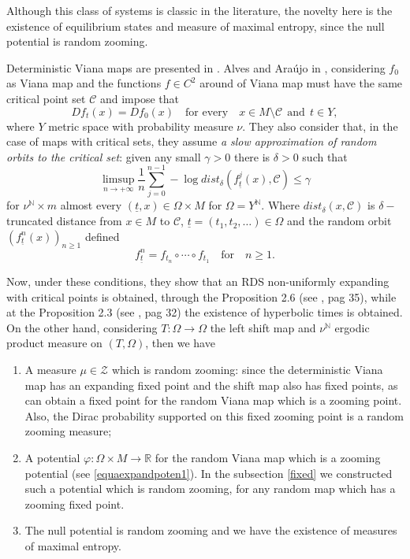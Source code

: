 \documentclass[12pt,a4paper]{amsart}
\theoremstyle{plain}
\begin{document}
	
	Although this class of systems is classic in the literature, the novelty here is the existence of equilibrium states and measure of maximal entropy, since the null potential is random zooming. 
	
	Deterministic Viana maps are presented in \cite{A,V}. Alves and Ara\'ujo in \cite{AlvesAraujo}, considering $f_0$ as Viana map and the functions $f\in C^2$ around of Viana map must have the same critical point set $\mathcal{C}$ and impose that
	\[
	Df_{t}(x)=Df_0(x) \quad \text{for every} \quad x\in M\setminus \mathcal{C} \ \ \text{and} \ \ t\in Y,
	\]
	where $Y$ metric space with probability measure $\nu$. They also consider that, in the case of maps with critical sets, they assume {\it a slow approximation of random orbits to the critical set}: given any small $\gamma > 0$ there is $\delta >0$ such that
	$$
	\limsup_{n\to +\infty}\dfrac{1}{n}\sum_{j=0}^{n-1}-\log dist_{\delta} (f_{\underline{t}}^{j}(x), \mathcal{C}) \le \gamma
	$$
	for  $ \nu^{\mathbb{N}}\times m$ almost every $(\underline{t},x) \in \Omega\times M$ for $\Omega = Y^{\mathbb{N}}$. Where $dist_{\delta}(x,\mathcal{C})$  is $\delta-$truncated distance from $x\in M$ to $\mathcal{C}$, $\underline{t}=(t_1,t_2,\dots)\in \Omega$ and the random orbit $(f_{\underline{t}}^{n}(x))_{n\geq 1}$ defined
	$$
	f_{\underline{t}}^{n}= f_{t_n}\circ \cdots \circ f_{t_1} \quad \text{for} \quad n\ge 1
	. $$
	
	Now, under these conditions, they show that an RDS non-uniformly expanding with critical points is obtained, through the Proposition 2.6 (see \cite{AlvesAraujo}, pag 35), while at the Proposition 2.3 (see \cite{AlvesAraujo}, pag 32) the existence of hyperbolic times is obtained. \\
	On the other hand, considering $T:\Omega \rightarrow \Omega$  the left shift  map and $\nu^{\mathbb{N}}$ ergodic product measure on $(T, \Omega)$, then we have 
	
	\begin{enumerate}
		\item  [i)] A measure $\mu \in \mathcal{Z}$ which is random zooming: since the deterministic Viana map has an expanding fixed point and the shift map also has fixed points, as can obtain a fixed point for the random Viana map which is a zooming point. Also, the Dirac probability supported on this fixed zooming point is a random zooming measure; 
		
		\item [ii)] A potential $\varphi: \Omega\times M \rightarrow \mathbb{R}$  for the random Viana map which is a zooming potential (see \ref{equaexpandpoten1}). In the subsection \ref{fixed} we constructed such a potential which is random zooming, for any  random map which has a zooming fixed point.
		
		\item[iii)] The null potential is random zooming and we have the existence of measures of maximal entropy.
	\end{enumerate}
	
\end{document}
